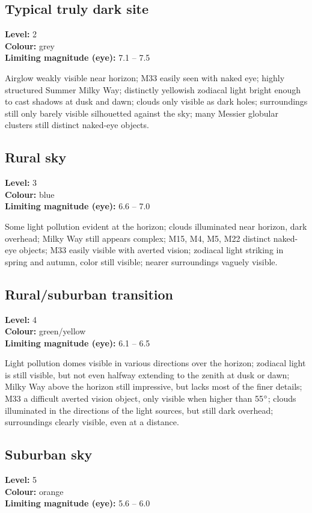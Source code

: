 \subsection{Typical truly dark site}
\textbf{Level:} 2 \\
\textbf{Colour:} grey \\
\textbf{Limiting magnitude (eye):} 7.1 -- 7.5

Airglow weakly visible near horizon; M33 easily seen with naked eye; highly structured Summer Milky Way; distinctly yellowish zodiacal light bright enough to cast shadows at dusk and dawn; clouds only visible as dark holes; surroundings still only barely visible silhouetted against the sky; many Messier globular clusters still distinct naked-eye objects.

\subsection{Rural sky}
\textbf{Level:} 3 \\
\textbf{Colour:} blue \\
\textbf{Limiting magnitude (eye):} 6.6 -- 7.0

Some light pollution evident at the horizon; clouds illuminated near horizon, dark overhead; Milky Way still appears complex; M15, M4, M5, M22 distinct naked-eye objects; M33 easily visible with averted vision; zodiacal light striking in spring and
autumn, color still visible; nearer surroundings vaguely visible.

\subsection{Rural/suburban transition}
\textbf{Level:} 4 \\
\textbf{Colour:} green/yellow \\
\textbf{Limiting magnitude (eye):} 6.1 -- 6.5

Light pollution domes visible in various directions over the horizon; zodiacal light is still visible, but not even halfway extending to the zenith at dusk or dawn; Milky Way above the horizon still impressive, but lacks most of the finer details; M33 a difficult averted vision object, only visible when higher than 55$\degree$; clouds illuminated in the directions of the light sources, but still dark overhead; surroundings clearly visible, even at a distance.

\subsection{Suburban sky}
\textbf{Level:} 5 \\
\textbf{Colour:} orange \\
\textbf{Limiting magnitude (eye):} 5.6 -- 6.0

